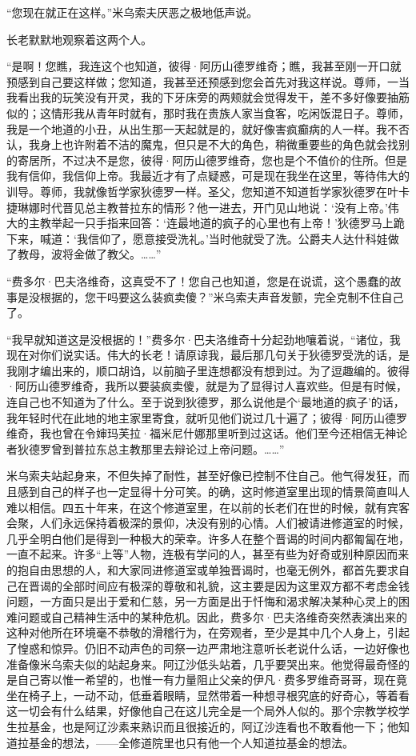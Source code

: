 \par “您现在就正在这样。”米乌索夫厌恶之极地低声说。
\par 长老默默地观察着这两个人。
\par “是啊！您瞧，我连这个也知道，彼得·阿历山德罗维奇；瞧，我甚至刚一开口就预感到自己要这样做；您知道，我甚至还预感到您会首先对我这样说。尊师，一当我看出我的玩笑没有开灵，我的下牙床旁的两颊就会觉得发干，差不多好像要抽筋似的；这情形我从青年时就有，那时我在贵族人家当食客，吃闲饭混日子。尊师，我是一个地道的小丑，从出生那一天起就是的，就好像害疯癫病的人一样。我不否认，我身上也许附着不洁的魔鬼，但只是不大的角色，稍微重要些的角色就会找别的寄居所，不过决不是您，彼得·阿历山德罗维奇，您也是个不值价的住所。但是我有信仰，我信仰上帝。我最近才有了点疑惑，可是现在我坐在这里，等待伟大的训导。尊师，我就像哲学家狄德罗一样。圣父，您知道不知道哲学家狄德罗在叶卡捷琳娜时代晋见总主教普拉东的情形？他一进去，开门见山地说：‘没有上帝。’伟大的主教举起一只手指来回答：‘连最地道的疯子的心里也有上帝！’狄德罗马上跪下来，喊道：‘我信仰了，愿意接受洗礼。’当时他就受了洗。公爵夫人达什科娃做了教母，波将金做了教父。……”
\par “费多尔·巴夫洛维奇，这真受不了！您自己也知道，您是在说谎，这个愚蠢的故事是没根据的，您干吗要这么装疯卖傻？”米乌索夫声音发颤，完全克制不住自己了。
\par “我早就知道这是没根据的！”费多尔·巴夫洛维奇十分起劲地嚷着说，“诸位，我现在对你们说实话。伟大的长老！请原谅我，最后那几句关于狄德罗受洗的话，是我刚才编出来的，顺口胡诌，以前脑子里连想都没有想到过。为了逗趣编的。彼得·阿历山德罗维奇，我所以要装疯卖傻，就是为了显得讨人喜欢些。但是有时候，连自己也不知道为了什么。至于说到狄德罗，那么说他是个‘最地道的疯子’的话，我年轻时代在此地的地主家里寄食，就听见他们说过几十遍了；彼得·阿历山德罗维奇，我也曾在令婶玛芙拉·福米尼什娜那里听到过这话。他们至今还相信无神论者狄德罗曾到普拉东总主教那里去辩论过上帝问题。……”
\par 米乌索夫站起身来，不但失掉了耐性，甚至好像已控制不住自己。他气得发狂，而且感到自己的样子也一定显得十分可笑。的确，这时修道室里出现的情景简直叫人难以相信。四五十年来，在这个修道室里，在以前的长老们在世的时候，就有宾客会聚，人们永远保持着极深的景仰，决没有别的心情。人们被请进修道室的时候，几乎全明白他们是得到一种极大的荣幸。许多人在整个晋谒的时间内都匍匐在地，一直不起来。许多“上等”人物，连极有学问的人，甚至有些为好奇或别种原因而来的抱自由思想的人，和大家同进修道室或单独晋谒时，也毫无例外，都首先要求自己在晋谒的全部时间应有极深的尊敬和礼貌，这主要是因为这里双方都不考虑金钱问题，一方面只是出于爱和仁慈，另一方面是出于忏悔和渴求解决某种心灵上的困难问题或自己精神生活中的某种危机。因此，费多尔·巴夫洛维奇突然表演出来的这种对他所在环境毫不恭敬的滑稽行为，在旁观者，至少是其中几个人身上，引起了惶惑和惊异。仍旧不动声色的司祭一边严肃地注意听长老说什么话，一边好像也准备像米乌索夫似的站起身来。阿辽沙低头站着，几乎要哭出来。他觉得最奇怪的是自己寄以惟一希望的，也惟一有力量阻止父亲的伊凡·费多罗维奇哥哥，现在竟坐在椅子上，一动不动，低垂着眼睛，显然带着一种想寻根究底的好奇心，等着看这一切会有什么结果，好像他自己在这儿完全是一个局外人似的。那个宗教学校学生拉基金，也是阿辽沙素来熟识而且很接近的，阿辽沙连看也不敢看他一下；他知道拉基金的想法，——全修道院里也只有他一个人知道拉基金的想法。
